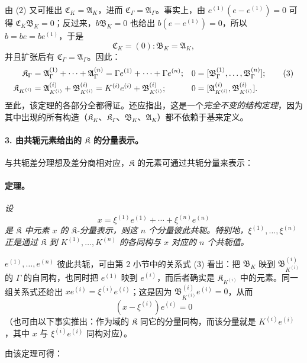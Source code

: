 由 (2) 又可推出 $\mathfrak C_K=\mathfrak A_K$，进而 $\mathfrak C_\Gamma=\mathfrak A_\Gamma$。事实上，由 $e^{(1)}(e-e^{(1)})=0$ 可得 $\mathfrak C_K\mathfrak B_K=0$；反过来，$b\mathfrak B_K=0$ 也给出 $b(e-e^{(1)})=0$，所以 $b=be=be^{(1)}$，于是
\[
\mathfrak C_K=(0):\mathfrak B_K=\mathfrak A_K,
\]
并且扩张后有 $\mathfrak C_\Gamma=\mathfrak A_\Gamma$。因此：
\begin{align}
\mathfrak K_\Gamma
&=\mathfrak A_\Gamma^{(1)}+\cdots+\mathfrak A_\Gamma^{(n)}
=\Gamma e^{(1)}+\cdots+\Gamma e^{(n)};
&0&=[\mathfrak B_\Gamma^{(1)},\ldots,\mathfrak B_\Gamma^{(n)}]; \tag{3}\\
\mathfrak K_{K^{(i)}}
&=\mathfrak A_{K^{(i)}}^{(i)}+\mathfrak B_{K^{(i)}}^{(i)}
=K^{(i)}e^{(i)}+\mathfrak B_{K^{(i)}}^{(i)};
&0&=[\mathfrak A_{K^{(i)}}^{(i)},\mathfrak B_{K^{(i)}}^{(i)}].\notag
\end{align}
至此，该定理的各部分全都得证。还应指出，这是一个\emph{完全不变的结构定理}，因为其中出现的所有构造（$\mathfrak K_K$、$\mathfrak K_\Gamma$、$\mathfrak B_K$、$\mathfrak A_K$）都不依赖于基来定义。

\paragraph{3. 由共轭元素给出的 $\mathfrak K$ 的分量表示。}
与共轭差分理想及差分商相对应，$\mathfrak K$ 的元素可通过共轭分量来表示：

\paragraph{定理。}
\emph{设
\[
x=\xi^{(1)}e^{(1)}+\cdots+\xi^{(n)}e^{(n)}
\]
是 $\mathfrak K$ 中元素 $x$ 的 $\mathfrak K$-分量表示，则这 $n$ 个分量彼此共轭。特别地，$\xi^{(1)},\ldots,\xi^{(n)}$ 正是通过 $\mathfrak K$ 到 $K^{(1)},\ldots,K^{(n)}$ 的各同构与 $x$ 对应的 $n$ 个共轭值。}

$e^{(1)},\ldots,e^{(n)}$ 彼此共轭，可由第 2 小节中的关系式 (3) 看出：把 $\mathfrak B_K$ 映到 $\mathfrak B_{K^{(i)}}^{(i)}$ 的 $\Gamma$ 的自同构，也同时把 $e^{(1)}$ 映到 $e^{(i)}$，而后者确实是 $\mathfrak K_{K^{(i)}}$ 中的元素。同一组关系式还给出 $xe^{(i)}=\xi^{(i)}e^{(i)}$；这是因为 $\mathfrak B_{K^{(i)}}^{(i)}e^{(i)}=0$，从而
\[
(x-\xi^{(i)})e^{(i)}=0
\]
（也可由以下事实推出：作为域的 $\mathfrak K$ 同它的分量同构，而该分量就是 $K^{(i)}e^{(i)}$，其中 $x$ 与 $\xi^{(i)}e^{(i)}$ 同构对应）。

由该定理可得：

